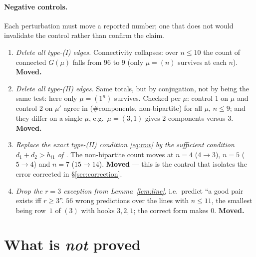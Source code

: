 \documentclass[11pt]{article}
\theoremstyle{definition}
\begin{document}
\paragraph{Negative controls.} Each perturbation must move a reported number; one that does
not would invalidate the control rather than confirm the claim.
\begin{enumerate}
\item \emph{Delete all type-(I) edges.} Connectivity collapses: over $n\le10$ the count of
      connected $G(\mu)$ falls from $96$ to $9$ (only $\mu=(n)$ survives at each $n$).
      \textbf{Moved.}
\item \emph{Delete all type-(II) edges.} Same totals, but by conjugation, not by being the
      same test: here only $\mu=(1^n)$ survives. Checked per $\mu$: control 1 on $\mu$ and
      control 2 on $\mu'$ agree in (\#components, non-bipartite) for all $\mu$, $n\le9$; and
      they differ on a single $\mu$, e.g.\ $\mu=(3,1)$ gives $2$ components versus $3$.
      \textbf{Moved.}
\item \emph{Replace the exact type-(II) condition \eqref{eq:row} by the sufficient condition
      $d_1+d_2>h_{i1}$ of \cite[\S7(2)]{Q140}.} The non-bipartite count moves at
      $n=4$ ($4\to3$), $n=5$ ($5\to4$) and $n=7$ ($15\to14$). \textbf{Moved} --- this is the
      control that isolates the error corrected in \S\ref{sec:correction}.
\item \emph{Drop the $r=3$ exception from Lemma~\ref{lem:line}}, i.e.\ predict ``a good pair
      exists iff $r\ge3$''. $56$ wrong predictions over the lines with $n\le11$, the smallest
      being row~$1$ of $(3)$ with hooks $3,2,1$; the correct form makes $0$. \textbf{Moved.}
\end{enumerate}

\section{What is \emph{not} proved}
\end{document}
